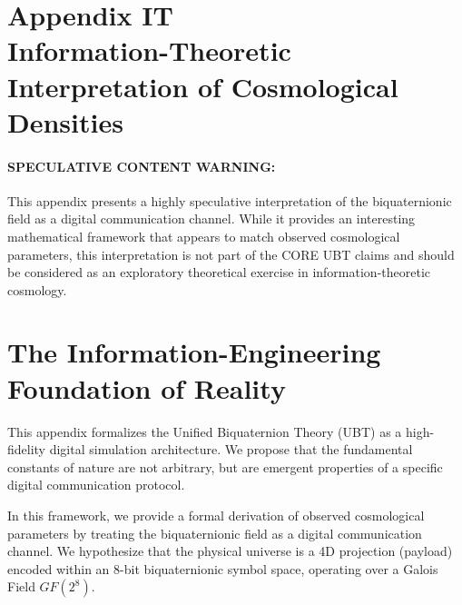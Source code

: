 %


\section*{Appendix IT \\ Information-Theoretic Interpretation of Cosmological Densities}

\paragraph{SPECULATIVE CONTENT WARNING:}
This appendix presents a highly speculative interpretation of the biquaternionic field as a digital communication channel. While it provides an interesting mathematical framework that appears to match observed cosmological parameters, this interpretation is not part of the CORE UBT claims and should be considered as an exploratory theoretical exercise in information-theoretic cosmology.

\section{The Information-Engineering Foundation of Reality}

This appendix formalizes the Unified Biquaternion Theory (UBT) as a high-fidelity digital simulation architecture. We propose that the fundamental constants of nature are not arbitrary, but are emergent properties of a specific digital communication protocol.

In this framework, we provide a formal derivation of observed cosmological parameters by treating the biquaternionic field as a digital communication channel. We hypothesize that the physical universe is a 4D projection (payload) encoded within an 8-bit biquaternionic symbol space, operating over a Galois Field $GF(2^8)$.

